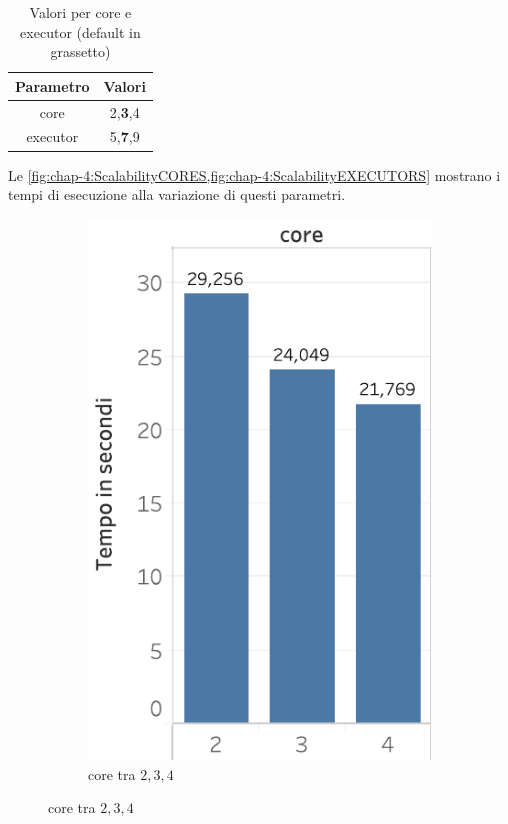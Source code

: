 \begin{table}[H]
    \centering
   \begin{tabular}{||c c||}
 \hline
     Parametro & Valori \\ [0.4ex] 
 \hline\hline
   core & 2,\textbf{3},4 \\
 \hline
  executor & 5,\textbf{7},9 \\
 \hline
\end{tabular}
    \caption{Valori per core e executor (default in grassetto)}
    \label{tab:cores-executors-variation}
\end{table}


Le \cref{fig:chap-4:ScalabilityCORES,fig:chap-4:ScalabilityEXECUTORS}
mostrano i tempi di esecuzione alla variazione di questi parametri.

\begin{figure}
  \centering
   \begin{subfigure}{.5\textwidth}
  \centering
      \includegraphics[scale=0.5]{res/fig/sec-4/scalability/ScalabilityDataCORES.pdf}
  \caption{core tra \(2,3,4\)}%
  \label{fig:chap-4:ScalabilityCORES}
\end{subfigure}%

\end{figure}
